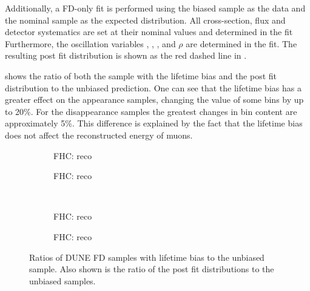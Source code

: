 Additionally, a FD-only fit is performed using the biased sample as the data and the nominal sample as the expected distribution. 
All cross-section, flux and detector systematics are set at their nominal values and determined in the fit 
Furthermore, the oscillation variables , , \dcp,  and $\rho$ are determined in the fit.
The resulting post fit distribution is shown as the red dashed line in .

 shows the ratio of both the sample with the lifetime bias and the post fit distribution to the unbiased prediction.
One can see that the lifetime bias has a greater effect on the appearance samples, changing the value of some bins by up to 20\%.
For the disappearance samples the greatest changes in bin content are approximately 5\%. 
This difference is explained by the fact that the lifetime bias does not affect the reconstructed energy of muons.

\begin{figure}[h]
	\begin{subfigure}[t]{.5\textwidth}
		\begin{adjustbox}{max totalsize=\textwidth, center}
			
		\end{adjustbox}
		\caption{FHC: reco \numu}
	\end{subfigure}
	\hfill
	\begin{subfigure}[t]{.5\textwidth}
		\begin{adjustbox}{max totalsize=\textwidth, center}
			
		\end{adjustbox}
		\caption{FHC: reco \nue}
	\end{subfigure}
	\\
	\begin{subfigure}[t]{.5\textwidth}
		\begin{adjustbox}{max totalsize=\textwidth, center}
			
		\end{adjustbox}
		\caption{FHC: reco \anumu}
	\end{subfigure}
	\hfill
	\begin{subfigure}[t]{.5\textwidth}
		\begin{adjustbox}{max totalsize=\textwidth, center}
			
		\end{adjustbox}
		\caption{FHC: reco \anue}
	\end{subfigure}
	\caption[Ratios of DUNE FD energy biased and post fit samples to nominal]{Ratios of DUNE FD samples with lifetime bias to the unbiased sample. Also shown is the ratio of the post fit distributions to the unbiased samples.}	
	\label{fig:fdSamplesLifetimeRatio}
\end{figure}

